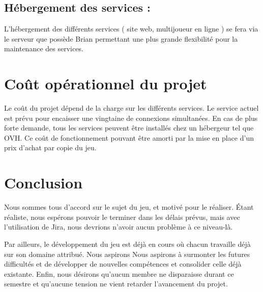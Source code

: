 \documentclass[a4paper,11pt]{article}
\begin{document}
\subsection{Hébergement des services :}
	
L'hébergement des différents services ( site web, multijoueur en ligne ) se fera via le serveur 
que possède Brian permettant une plus grande flexibilité pour la maintenance des services.



\section{Coût opérationnel du projet}

Le coût du projet dépend de la charge sur les différents services.
Le service actuel est prévu pour encaisser une vingtaine de connexions simultanées.
En cas de plus forte demande, tous les services peuvent être installés chez un hébergeur tel que OVH. 
Ce coût de fonctionnement pouvant être amorti par la mise en place d’un prix d’achat par copie du jeu.


\section{Conclusion}

Nous sommes tous d'accord sur le sujet du jeu, et motivé pour le réaliser. Étant réaliste, nous espérons pouvoir le terminer
dans les délais prévus, mais avec l'utilisation de Jira, nous devrions n'avoir aucun problème à ce niveau-là.

Par ailleurs, le développement du jeu est déjà en cours où chacun travaille déjà sur son domaine attribué. Nous aspirons
Nous aspirons à surmonter les futures difficultés et de développer de nouvelles compétences et consolider celle déjà existante.
Enfin, nous désirons qu'aucun membre ne disparaisse durant ce semestre et qu'aucune tension ne vient retarder l'avancement du projet.
\end{document}
